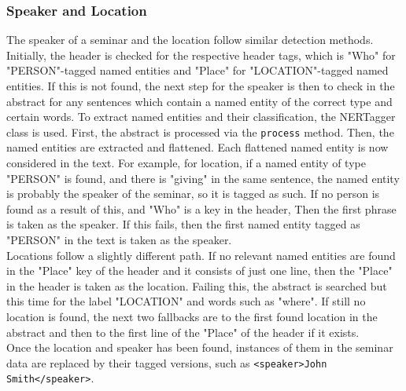 \documentclass[10pt]{article}
\begin{document}
\begin{multicols}{2}
\subsubsection{Speaker and Location}
The speaker of a seminar and the location follow similar detection methods. Initially, the header is checked for the respective header tags, which is "Who" for "PERSON"-tagged named entities and "Place" for "LOCATION"-tagged named entities. If this is not found, the next step for the speaker is then to check in the abstract for any sentences which contain a named entity of the correct type and certain words. To extract named entities and their classification, the NERTagger class is used. First, the abstract is processed via the {{\tt process}} method. Then, the named entities are extracted and flattened. Each flattened named entity is now considered in the text. For example, for location, if a named entity of type "PERSON" is found, and there is "giving" in the same sentence, the named entity is probably the speaker of the seminar, so it is tagged as such. If no person is found as a result of this, and "Who" is a key in the header, Then the first phrase is taken as the speaker. If this fails, then the first named entity tagged as "PERSON" in the text is taken as the speaker. \\Locations follow a slightly different path. If no relevant named entities are found in the "Place" key of the header and it consists of just one line, then the "Place" in the header is taken as the location. Failing this, the abstract is searched but this time for the label "LOCATION" and words such as "where". If still no location is found, the next two fallbacks are to the first found location in the abstract and then to the first line of the "Place" of the header if it exists.\\
Once the location and speaker has been found, instances of them in the seminar data are replaced by their tagged versions, such as {{\tt <speaker>John Smith</speaker>}}.


\end{multicols}
\end{document}
